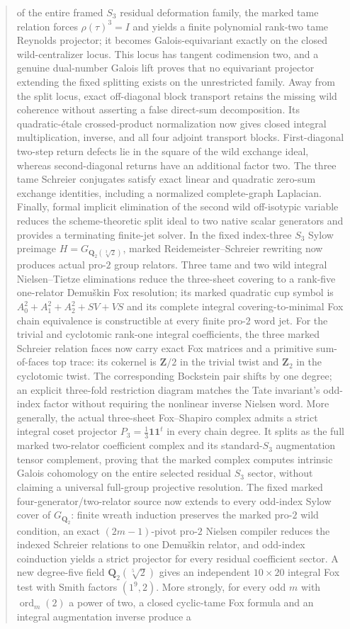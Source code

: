 \documentclass[11pt]{article}
\theoremstyle{definition}
\begin{document}
\begin{abstract}
of the entire framed $S_3$ residual deformation family, the marked tame relation forces $\rho(\tau)^3=I$ and yields a finite polynomial rank-two tame Reynolds projector; it becomes Galois-equivariant exactly on the closed wild-centralizer locus.  This locus has tangent codimension two, and a genuine dual-number Galois lift proves that no equivariant projector extending the fixed splitting exists on the unrestricted family.  Away from the split locus, exact off-diagonal block transport retains the missing wild coherence without asserting a false direct-sum decomposition.  Its quadratic-\'etale crossed-product normalization now gives closed integral multiplication, inverse, and all four adjoint transport blocks.  First-diagonal two-step return defects lie in the square of the wild exchange ideal, whereas second-diagonal returns have an additional factor two.  The three tame Schreier conjugates satisfy exact linear and quadratic zero-sum exchange identities, including a normalized complete-graph Laplacian.  Finally, formal implicit elimination of the second wild off-isotypic variable reduces the scheme-theoretic split ideal to two native scalar generators and provides a terminating finite-jet solver.  In the fixed index-three $S_3$ Sylow preimage $H=G_{\mathbf Q_2(\sqrt[3]2)}$, marked Reidemeister--Schreier rewriting now produces actual pro-$2$ group relators.  Three tame and two wild integral Nielsen--Tietze eliminations reduce the three-sheet covering to a rank-five one-relator Demu\v{s}kin Fox resolution; its marked quadratic cup symbol is $A_0^2+A_1^2+A_2^2+SV+VS$ and its complete integral covering-to-minimal Fox chain equivalence is constructible at every finite pro-$2$ word jet.  For the trivial and cyclotomic rank-one integral coefficients, the three marked Schreier relation faces now carry exact Fox matrices and a primitive sum-of-faces top trace: its cokernel is $\mathbf Z/2$ in the trivial twist and $\mathbf Z_2$ in the cyclotomic twist.  The corresponding Bockstein pair shifts by one degree; an explicit three-fold restriction diagram matches the Tate invariant's odd-index factor without requiring the nonlinear inverse Nielsen word.  More generally, the actual three-sheet Fox--Shapiro complex admits a strict integral coset projector $P_3=\frac13\mathbf1\mathbf1^t$ in every chain degree.  It splits as the full marked two-relator coefficient complex and its standard-$S_3$ augmentation tensor complement, proving that the marked complex computes intrinsic Galois cohomology on the entire selected residual $S_3$ sector, without claiming a universal full-group projective resolution.  The fixed marked four-generator/two-relator source now extends to every odd-index Sylow cover of $G_{\mathbf Q_2}$: finite wreath induction preserves the marked pro-$2$ wild condition, an exact $(2m-1)$-pivot pro-$2$ Nielsen compiler reduces the indexed Schreier relations to one Demu\v{s}kin relator, and odd-index coinduction yields a strict projector for every residual coefficient sector.  A new degree-five field $\mathbf Q_2(\sqrt[5]2)$ gives an independent $10\times20$ integral Fox test with Smith factors $(1^9,2)$.  More strongly, for every odd $m$ with $\operatorname{ord}_m(2)$ a power of two, a closed cyclic-tame Fox formula and an integral augmentation inverse produce a 
\end{abstract}
\end{document}
